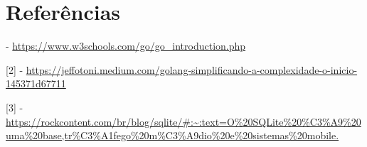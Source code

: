 \documentclass[a4paper, 12pt]{article}
\begin{document}
    \newpage
    \section{Referências}

    \begingroup
    \fontsize{10}{12}\selectfont
        [1] - \url{https://www.w3schools.com/go/go_introduction.php}

        [2] - \url{https://jeffotoni.medium.com/golang-simplificando-a-complexidade-o-inicio-145371d67711}

        [3] - \url{https://rockcontent.com/br/blog/sqlite/#:~:text=O%20SQLite%20%C3%A9%20uma%20base,tr%C3%A1fego%20m%C3%A9dio%20e%20sistemas%20mobile.}
    \endgroup
\end{document}
